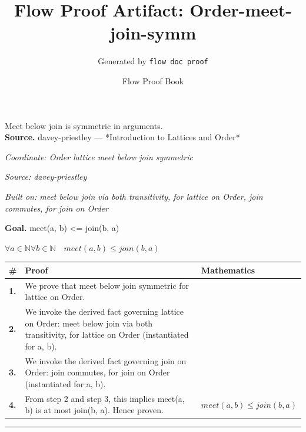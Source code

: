 \documentclass[11pt]{article}
\title{Flow Proof Artifact: Order-meet-join-symm}
\author{Generated by \texttt{flow doc proof}}
\date{Flow Proof Book}
\theoremstyle{definition}
\begin{document}
\maketitle
Meet below join is symmetric in arguments.\\[0.5em]
\textbf{Source.} davey-priestley — *Introduction to Lattices and Order*\\[0.5em]
\bigskip
{}\par
\smallskip\noindent\textit{Coordinate: Order \cdot lattice \cdot meet below join symmetric}\par
\smallskip\noindent\textit{Source: davey-priestley}\par
\smallskip\noindent\textit{Built on: meet below join via both transitivity, for lattice on Order, join commutes, for join on Order}\par
\medskip
\noindent\textbf{Goal.} meet(a, b) <= join(b, a)\par
\noindent$\displaystyle \forall a \in \mathbb{N} \forall b \in \mathbb{N}\quad meet(a, b) \le join(b, a)$\par
\medskip
\noindent
\begin{tabular}{@{} >{\raggedright\arraybackslash}p{} >{\raggedright\arraybackslash}p{} >{\raggedleft\arraybackslash}p{} @{}}
\textbf{\#} & \textbf{Proof} & \textbf{Mathematics} \\
\midrule
\textbf{1.} & We prove that meet below join symmetric for lattice on Order. & \\[0.45em]
\textbf{2.} & We invoke the derived fact governing lattice on Order: meet below join via both transitivity, for lattice on Order (instantiated for a, b). & \\[0.45em]
\textbf{3.} & We invoke the derived fact governing join on Order: join commutes, for join on Order (instantiated for a, b). & \\[0.45em]
\textbf{4.} & From step 2 and step 3, this implies meet(a, b) is at most join(b, a). Hence proven. & $\displaystyle meet(a, b) \le join(b, a)$ \\[0.45em]
\bottomrule
\end{tabular}
\label{thm:Order-lattice-meet_below_join_symmetric}
\par\medskip\hrule
\end{document}
